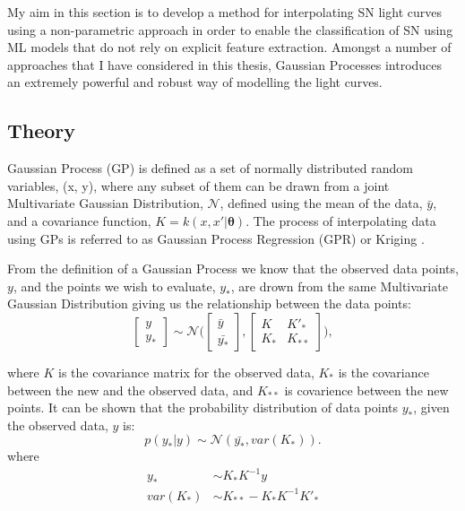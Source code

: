 My aim in this section is to develop a method for interpolating SN light curves using a non-parametric approach in order to enable the classification of SN using ML models that do not rely on explicit feature extraction. Amongst a number of approaches that I have considered in this thesis, Gaussian Processes introduces an extremely powerful and robust way of modelling the light curves.

\subsection{Theory}
Gaussian Process (GP) \citep{Rasmussen2006} is defined as a set of normally distributed random variables, (x, y), where any subset of them can be drawn from a joint Multivariate Gaussian Distribution, $\mathcal{N}$, defined using the mean of the data, $\bar{y}$, and a covariance function, $K = k(x, x'|\mathbf{\theta})$. The process of interpolating data using GPs is referred to as Gaussian Process Regression (GPR) or Kriging \citep{krige1951,Rasmussen2006,Ebden2015}.

From the definition of a Gaussian Process we know that the observed data points, $y$, and the points we wish to evaluate, $y_*$, are drown from the same Multivariate Gaussian Distribution giving us the relationship between the data points:
\begin{equation}
\begin{bmatrix} y \\ y_* \end{bmatrix} \sim \mathcal{N}\Biggl(\begin{bmatrix} \bar{y} \\ \bar{y_*} \end{bmatrix},\begin{bmatrix} K & K'_*\\
 K_* & K_{**} \end{bmatrix}\Biggr),
\end{equation}

\noindent where $K$ is the covariance matrix for the observed data, $K_*$ is the covariance between the new and the observed data, and $K_{**}$ is covarience between the new points. It can be shown \citep{Rasmussen2006} that the probability distribution of data points $y_*$, given the observed data, $y$ is:
\begin{equation}
p(y_*|y) \sim \mathcal{N}(\bar{y_*},var(K_*)).
\end{equation}
\noindent where
\begin{align}
y_* &\sim K_*K^{-1}y \\
var(K_*) &\sim K_{**}-K_*K^{-1}K'_*
\end{align}

